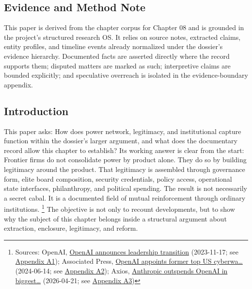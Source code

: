 \documentclass[
  american,
  11pt,
  letterpaper,
]{article}
\begin{document}
\subsection{Evidence and Method Note}\label{evidence-and-method-note-8}

This paper is derived from the chapter corpus for Chapter 08 and is
grounded in the project's structured research OS. It relies on source
notes, extracted claims, entity profiles, and timeline events already
normalized under the dossier's evidence hierarchy. Documented facts are
asserted directly where the record supports them; disputed matters are
marked as such; interpretive claims are bounded explicitly; and
speculative overreach is isolated in the evidence-boundary appendix.

\subsection{Introduction}\label{introduction-8}

This paper asks: How does power network, legitimacy, and institutional
capture function within the dossier's larger argument, and what does the
documentary record allow this chapter to establish? Its working answer
is clear from the start: Frontier firms do not consolidate power by
product alone. They do so by building legitimacy around the product.
That legitimacy is assembled through governance form, elite board
composition, security credentials, policy access, operational state
interfaces, philanthropy, and political spending. The result is not
necessarily a secret cabal. It is a documented field of mutual
reinforcement through ordinary institutions. \footnote{Sources: OpenAI,
  \href{https://openai.com/index/openai-announces-leadership-transition/}{OpenAI
  announces leadership transition} (2023-11-17; see
  \hyperref[ch-08-appendix-a1-openai-announces-leadership-transition]{Appendix
  A1}); Associated Press,
  \href{https://apnews.com/article/6ef612a3a0fcaef05480bbd1ebbd79b1}{OpenAI
  appoints former top US cyberwa\ldots{}} (2024-06-14; see
  \hyperref[ch-08-appendix-a2-openai-appoints-former-top-us-cyberwarrior-paul-nakasone-to-its-board-of-directors]{Appendix
  A2}); Axios,
  \href{https://www.axios.com/2026/04/21/anthropic-outspends-openai-biggest-lobbying-quarter}{Anthropic
  outspends OpenAI in biggest\ldots{}} (2026-04-21; see
  \hyperref[ch-08-appendix-a3-anthropic-outspends-openai-in-biggest-ever-lobbying-quarter]{Appendix
  A3})} The objective is not only to recount developments, but to show
why the subject of this chapter belongs inside a structural argument
about extraction, enclosure, legitimacy, and reform.
\end{document}
